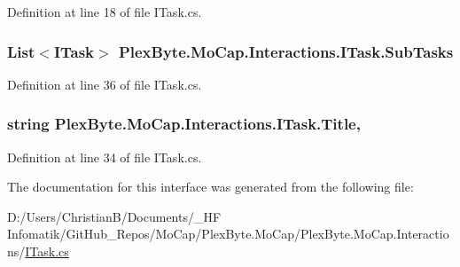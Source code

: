 Definition at line 18 of file I\+Task.\+cs.

\subsubsection[{\texorpdfstring{Sub\+Tasks}{SubTasks}}]{\setlength{\rightskip}{0pt plus 5cm}List$<${\bf I\+Task}$>$ Plex\+Byte.\+Mo\+Cap.\+Interactions.\+I\+Task.\+Sub\+Tasks\hspace{0.3cm}{\ttfamily [get]}}\hypertarget{interface_plex_byte_1_1_mo_cap_1_1_interactions_1_1_i_task_ac8f4d55c1b23a55959e86b9fb8f15d0e}{}\label{interface_plex_byte_1_1_mo_cap_1_1_interactions_1_1_i_task_ac8f4d55c1b23a55959e86b9fb8f15d0e}


Definition at line 36 of file I\+Task.\+cs.

\subsubsection[{\texorpdfstring{Title}{Title}}]{\setlength{\rightskip}{0pt plus 5cm}string Plex\+Byte.\+Mo\+Cap.\+Interactions.\+I\+Task.\+Title\hspace{0.3cm}{\ttfamily [get]}, {\ttfamily [set]}}\hypertarget{interface_plex_byte_1_1_mo_cap_1_1_interactions_1_1_i_task_a253ea25ebaf91c0307d4cbff0a8d4144}{}\label{interface_plex_byte_1_1_mo_cap_1_1_interactions_1_1_i_task_a253ea25ebaf91c0307d4cbff0a8d4144}


Definition at line 34 of file I\+Task.\+cs.



The documentation for this interface was generated from the following file\+:\begin{DoxyCompactItemize}
\item 
D\+:/\+Users/\+Christian\+B/\+Documents/\+\_\+\+H\+F Infomatik/\+Git\+Hub\+\_\+\+Repos/\+Mo\+Cap/\+Plex\+Byte.\+Mo\+Cap/\+Plex\+Byte.\+Mo\+Cap.\+Interactions/\hyperlink{_i_task_8cs}{I\+Task.\+cs}\end{DoxyCompactItemize}
